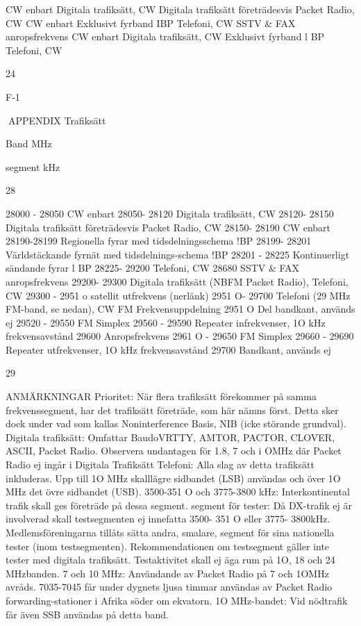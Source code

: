 \documentclass[a4paper,twoside,twocolumn,openright]{book}
\begin{document}
{{{{{{{{{{{CW enbart
Digitala trafiksätt, CW
Digitala trafiksätt företrädesvis Packet Radio, CW
CW enbart
Exklusivt fyrband IBP
Telefoni, CW
SSTV \& FAX anropsfrekvens
CW enbart
Digitala trafiksätt, CW
Exklusivt fyrband l BP
Telefoni, CW

24

F-1

APPENDIX
Trafiksätt

Band
MHz

segment
kHz

28

28000 - 28050
CW enbart
28050- 28120
Digitala trafiksätt, CW
28120- 28150
Digitala trafiksätt företrädesvis Packet Radio, CW
28150- 28190
CW enbart
28190-28199
Regionella fyrar med tidsdelningsschema !BP
28199- 28201
Världstäckande fyrnät med tidsdelnings-schema !BP
28201 - 28225
Kontinuerligt sändande fyrar l BP
28225- 29200
Telefoni, CW
28680
SSTV \& FAX anropsfrekvens
29200- 29300
Digitala trafiksätt (NBFM Packet Radio), Telefoni, CW
29300 - 2951 o
satellit utfrekvens (nerlänk)
2951 O- 29700
Telefoni (29 MHz FM-band, se nedan), CW
FM Frekvensuppdelning
2951 O
Del bandkant, används ej
29520 - 29550
FM Simplex
29560 - 29590
Repeater infrekvenser, 1O kHz frekvensavstånd
29600
Anropsfrekvens
2961 O - 29650
FM Simplex
29660 - 29690
Repeater utfrekvenser, 1O kHz frekvensavstånd
29700
Bandkant, används ej

29

ANMÄRKNINGAR
Prioritet:
När flera trafiksätt förekommer på samma frekvenssegment, har det trafiksätt företräde, som här nämns
först. Detta sker dock under vad som kallas Noninterference Basis, NIB (icke störande grundval).
Digitala trafiksätt:
Omfattar BaudoVRTTY, AMTOR, PACTOR, CLOVER,
ASCII, Packet Radio.
Observera undantagen för 1.8, 7 och i OMHz där Packet
Radio ej ingår i Digitala Trafiksätt
Telefoni:
Alla slag av detta trafiksätt inkluderas. Upp till 1O MHz
skalllägre sidbandet (LSB) användas och över 1O MHz
det övre sidbandet (USB).
3500-351 O och 3775-3800 kHz:
Interkontinental trafik skall ges företräde på dessa segment.
segment för tester:
Då DX-trafik ej är involverad skall testsegmenten ej
innefatta 3500- 351 O eller 3775- 3800kHz. Medlemsföreningarna tillåts sätta andra, smalare, segment för
sina nationella tester (inom testsegmenten).
Rekommendationen om testsegment gäller inte tester
med digitala trafiksätt.
Testaktivitet skall ej äga rum på 1O, 18 och 24 MHzbanden.
7 och 10 MHz:
Användande av Packet Radio på 7 och 1OMHz avråds.
7035-7045 får under dygnets ljusa timmar användas av
Packet Radio forwarding-stationer i Afrika söder om
ekvatorn.
1O MHz-bandet:
Vid nödtrafik får även SSB användas på detta band.

}}}}}}}}}}}
\end{document}

